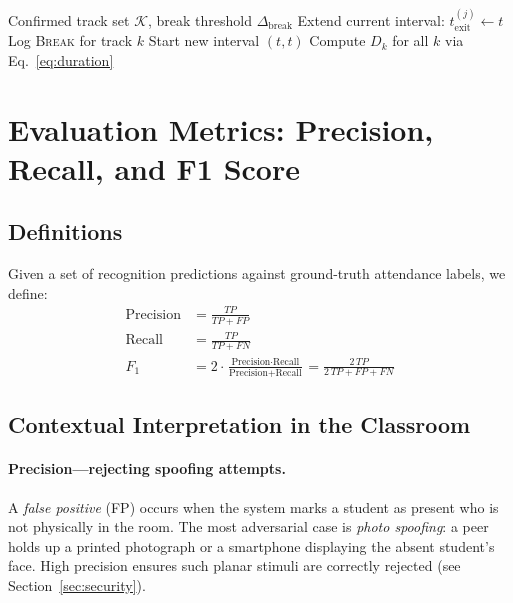 \documentclass[conference, 10pt]{IEEEtran}
\begin{document}
\begin{algorithm}[htbp]
\caption{Temporal Attendance Logging}
\label{alg:temporal}
\begin{algorithmic}[1]
\REQUIRE Confirmed track set $\mathcal{K}$, break threshold $\Delta_{\text{break}}$
            \STATE Extend current interval: $t_{\text{exit}}^{(j)} \leftarrow t$
            \STATE Log \textsc{Break} for track $k$
            \STATE Start new interval $(t, t)$
        \ENDIF
    \ENDFOR
\ENDFOR
\STATE Compute $D_k$ for all $k$ via Eq.~\eqref{eq:duration}
\end{algorithmic}
\end{algorithm}


\section{Evaluation Metrics: Precision, Recall, and F1 Score}
\label{sec:metrics}

\subsection{Definitions}

Given a set of recognition predictions against ground-truth attendance labels, we define:
\begin{align}
    \text{Precision} &= \frac{TP}{TP + FP} \label{eq:precision}\\[4pt]
    \text{Recall}    &= \frac{TP}{TP + FN} \label{eq:recall}\\[4pt]
    F_1              &= 2 \cdot \frac{\text{Precision} \cdot \text{Recall}}
                                      {\text{Precision} + \text{Recall}}
                      = \frac{2\,TP}{2\,TP + FP + FN} \label{eq:f1}
\end{align}

\subsection{Contextual Interpretation in the Classroom}

\paragraph{Precision---rejecting spoofing attempts.}
A \emph{false positive} (FP) occurs when the system marks a student as present who is not
physically in the room.  The most adversarial case is \emph{photo spoofing}: a peer holds up a
printed photograph or a smartphone displaying the absent student's face.  High precision
ensures such planar stimuli are correctly rejected (see Section~\ref{sec:security}).
\end{document}

